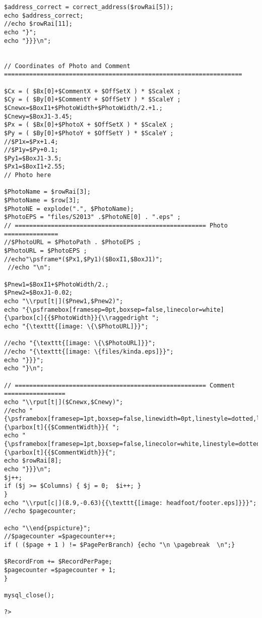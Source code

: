 \begin{verbatim}
$address_correct = correct_address($rowRai[5]);
echo $address_correct;
//echo $rowRai[11];
echo "}";
echo "}}}\n";


// Coordinates of Photo and Comment ==================================================================

$Cx = ( $Bx[0]+$CommentX + $OffSetX ) * $ScaleX ;
$Cy = ( $By[0]+$CommentY + $OffSetY ) * $ScaleY ;
$Cnewx=$BoxI1+$PhotoWidth+$PhotoWidth/2.+1.;
$Cnewy=$BoxJ1-3.45;
$Px = ( $Bx[0]+$PhotoX + $OffSetX ) * $ScaleX ;
$Py = ( $By[0]+$PhotoY + $OffSetY ) * $ScaleY ;
//$P1x=$Px+1.4;
//$P1y=$Py+0.1;
$Py1=$BoxJ1-3.5;
$Px1=$BoxI1+2.55;
// Photo here

$PhotoName = $rowRai[3];
$PhotoName = $row[3];
$PhotoNE = explode(".", $PhotoName);
$PhotoEPS = "files/S2013" .$PhotoNE[0] . ".eps" ;
// ===================================================== Photo ===============
//$PhotoURL = $PhotoPath . $PhotoEPS ;
$PhotoURL = $PhotoEPS ;
//echo"\psframe*($Px1,$Py1)($BoxI1,$BoxJ1)";
 //echo "\n";

$Pnew1=$BoxI1+$PhotoWidth/2.;
$Pnew2=$BoxJ1-0.02;
echo "\\rput[t|]($Pnew1,$Pnew2)";
echo "{\psframebox[framesep=0pt,boxsep=false,linecolor=white]{\parbox[c]{{$PhotoWidth}}{\\raggedright ";
echo "{\texttt{[image: \{\$PhotoURL]}}";

//echo "{\texttt{[image: \{\$PhotoURL]}}";
//echo "{\texttt{[image: \{files/kinda.eps]}}";
echo "}}}";
echo "}\n";

// ===================================================== Comment =================
echo "\\rput[t|]($Cnewx,$Cnewy)";
//echo "{\psframebox[framesep=1pt,boxsep=false,linewidth=0pt,linestyle=dotted,linecolor=white]{\parbox[t]{{$CommentWidth}}{ ";
echo "{\psframebox[framesep=1pt,boxsep=false,linecolor=white,linestyle=dotted,dotsep=100pt,linewidth=0pt]{\parbox[t]{{$CommentWidth}}{";
echo $rowRai[8]; 
echo "}}}\n";
$j++;
if ($j >= $Columns) { $j = 0;  $i++; }
}
echo "\\rput[c|](8.9,-0.63){{\texttt{[image: headfoot/footer.eps]}}}";
//echo $pagecounter;

echo "\\end{pspicture}";
//$pagecounter =$pagecounter++;
if ( ($page + 1 ) != $PagePerBranch) {echo "\n \pagebreak  \n";}

$RecordFrom += $RecordPerPage;
$pagecounter =$pagecounter + 1;
}

mysql_close();

?>
\end{verbatim}

